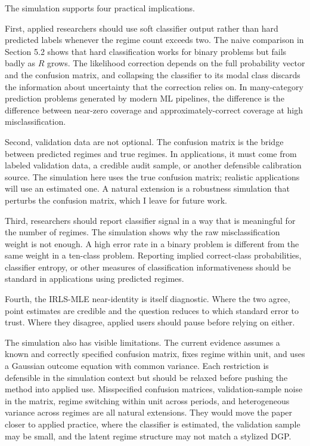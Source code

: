 \documentclass[
  12pt,
  letterpaper]{article}
\begin{document}
The simulation supports four practical implications.

First, applied researchers should use soft classifier output rather than
hard predicted labels whenever the regime count exceeds two. The naive
comparison in Section 5.2 shows that hard classification works for
binary problems but fails badly as \(R\) grows. The likelihood
correction depends on the full probability vector and the confusion
matrix, and collapsing the classifier to its modal class discards the
information about uncertainty that the correction relies on. In
many-category prediction problems generated by modern ML pipelines, the
difference is the difference between near-zero coverage and
approximately-correct coverage at high misclassification.

Second, validation data are not optional. The confusion matrix is the
bridge between predicted regimes and true regimes. In applications, it
must come from labeled validation data, a credible audit sample, or
another defensible calibration source. The simulation here uses the true
confusion matrix; realistic applications will use an estimated one. A
natural extension is a robustness simulation that perturbs the confusion
matrix, which I leave for future work.

Third, researchers should report classifier signal in a way that is
meaningful for the number of regimes. The simulation shows why the raw
misclassification weight is not enough. A high error rate in a binary
problem is different from the same weight in a ten-class problem.
Reporting implied correct-class probabilities, classifier entropy, or
other measures of classification informativeness should be standard in
applications using predicted regimes.

Fourth, the IRLS-MLE near-identity is itself diagnostic. Where the two
agree, point estimates are credible and the question reduces to which
standard error to trust. Where they disagree, applied users should pause
before relying on either.

The simulation also has visible limitations. The current evidence
assumes a known and correctly specified confusion matrix, fixes regime
within unit, and uses a Gaussian outcome equation with common variance.
Each restriction is defensible in the simulation context but should be
relaxed before pushing the method into applied use. Misspecified
confusion matrices, validation-sample noise in the matrix, regime
switching within unit across periods, and heterogeneous variance across
regimes are all natural extensions. They would move the paper closer to
applied practice, where the classifier is estimated, the validation
sample may be small, and the latent regime structure may not match a
stylized DGP.
\end{document}

